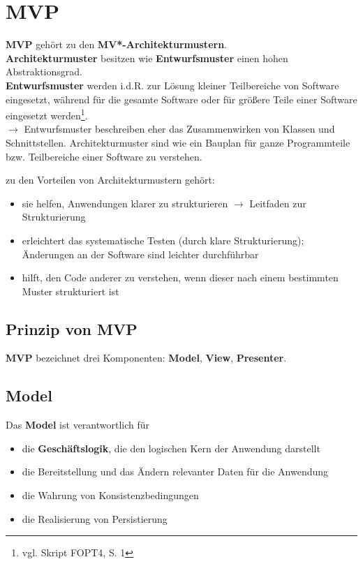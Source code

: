 \section{MVP}

\textbf{MVP} gehört zu den \textbf{MV*-Architekturmustern}.\\

\noindent
\textbf{Architekturmuster} besitzen wie \textbf{Entwurfsmuster} einen hohen Abstraktionsgrad.\\

\textbf{Entwurfsmuster} werden i.d.R. zur Lösung kleiner Teilbereiche von Software eingesetzt, während  für die gesamte Software oder für größere Teile einer Software eingesetzt werden\footnote{vgl. Skript FOPT4, S. 1}.\\
$\rightarrow$ Entwurfsmuster beschreiben eher das Zusammenwirken von Klassen und Schnittstellen.
Architekturmuster sind wie ein Bauplan für ganze Programmteile bzw. Teilbereiche einer Software zu verstehen.

\noindent
zu den Vorteilen von Architekturmustern gehört:

\begin{itemize}
    \item sie helfen, Anwendungen klarer zu strukturieren $\rightarrow$ Leitfaden zur Strukturierung
    \item erleichtert das systematische Testen (durch klare Strukturierung); Änderungen an der Software sind leichter durchführbar
    \item hilft, den Code anderer zu verstehen, wenn dieser nach einem bestimmten Muster strukturiert ist
\end{itemize}

\subsection{Prinzip von MVP}

\textbf{MVP} bezeichnet drei Komponenten: \textbf{Model}, \textbf{View}, \textbf{Presenter}.\\

\subsection*{Model}

Das \textbf{Model} ist verantwortlich für
\begin{itemize}
    \item die \textbf{Geschäftslogik}, die den logischen Kern der Anwendung darstellt
    \item die Bereitstellung und das Ändern relevanter Daten für die Anwendung
    \item die Wahrung von Konsistenzbedingungen
    \item die Realisierung von Persistierung
\end{itemize}

